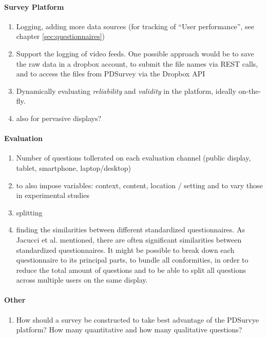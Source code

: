 \paragraph{Survey Platform}

	\begin{enumerate}
	\item Logging, adding more data sources (for tracking of ``User performance'', see chapter \ref{sec:questionnaires})
	\item Support the logging of video feeds. One possible approach would be to save the raw data in a dropbox account, to submit the file names via REST calls, and to access the files from PDSurvey via the Dropbox API
	\item Dynamically evaluating \textit{reliability} and \textit{validity} in the platform, ideally on-the-fly.
	\item also for pervasive displays?
	\end{enumerate}


\paragraph{Evaluation}

	\begin{enumerate}
	\item Number of questions tollerated on each evaluation channel (public display, tablet, smartphone, laptop/desktop)
	\item to also impose variables: context, content, location / setting and to vary those in experimental studies
	\item splitting 
	\item finding the similarities between different standardized questionnaires. As Jacucci et al. \cite{jacucci2010worldsofinformation} mentioned, there are often significant similarities between standardized questionnaires. It might be possible to break down each questionnaire to its principal parts, to bundle all conformities, in order to reduce the total amount of questions and to be able to split all questions across multiple users on the same display.
	\end{enumerate}


\paragraph{Other}
	\begin{enumerate}
	\item How should a survey be constructed to take best advantage of the PDSurvye platform? How many quantitative and how many qualitative questions?
	\end{enumerate}


